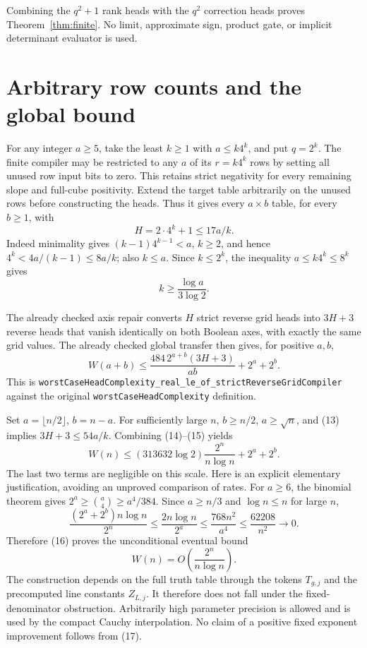 \documentclass[11pt]{article}
\begin{document}
Combining the $q^2+1$ rank heads with the $q^2$ correction heads
proves Theorem~\ref{thm:finite}. No limit, approximate sign, product
gate, or implicit determinant evaluator is used.

\section{Arbitrary row counts and the global bound}
For any integer $a\ge5$, take the least $k\ge1$ with
$a\le k4^k$, and put $q=2^k$. The finite compiler may be restricted
to any $a$ of its $r=k4^k$ rows by setting all unused row input bits
to zero. This retains strict negativity for every remaining slope
and full-cube positivity. Extend the target table arbitrarily on
the unused rows before constructing the heads. Thus it gives every
$a\times b$ table, for every $b\ge1$, with
\[
 H=2\cdot4^k+1\le17a/k.
 \tag{13}
\]
Indeed minimality gives $(k-1)4^{k-1}<a$, $k\ge2$, and hence
$4^k<4a/(k-1)\le8a/k$; also $k\le a$.
Since $k\le2^k$, the inequality $a\le k4^k\le8^k$ gives
\[
 k\ge\frac{\log a}{3\log2}.
 \tag{14}
\]

The already checked axis repair converts $H$ strict reverse grid
heads into $3H+3$ reverse heads that vanish identically on both
Boolean axes, with exactly the same grid values. The already checked
global transfer then gives, for positive $a,b$,
\[
 W(a+b)\le
 \frac{484\,2^{a+b}(3H+3)}{ab}+2^a+2^b.
 \tag{15}
\]
This is
\texttt{worstCaseHeadComplexity\_real\_le\_of\_strictReverseGridCompiler}
against the original \texttt{worstCaseHeadComplexity} definition.

Set $a=\lfloor n/2\rfloor$, $b=n-a$. For sufficiently large $n$,
$b\ge n/2$, $a\ge\sqrt n$, and (13) implies $3H+3\le54a/k$.
Combining (14)--(15) yields
\[
 W(n)\le
 (313632\log2)\frac{2^n}{n\log n}+2^a+2^b.
 \tag{16}
\]
The last two terms are negligible on this scale. Here is an explicit
elementary justification, avoiding an unproved comparison of rates.
For $a\ge6$, the binomial theorem gives
$2^a\ge\binom a4\ge a^4/384$. Since $a\ge n/3$ and
$\log n\le n$ for large $n$,
\[
 \frac{(2^a+2^b)n\log n}{2^n}
 \le\frac{2n\log n}{2^a}
 \le\frac{768n^2}{a^4}
 \le\frac{62208}{n^2}\longrightarrow0.
\]
Therefore (16) proves the unconditional eventual bound
\[
 \boxed{W(n)=O\!\left(\frac{2^n}{n\log n}\right).}
 \tag{17}
\]
The construction depends on the full truth table through the tokens
$T_{g,j}$ and the precomputed line constants $Z_{L,j}$. It therefore
does not fall under the fixed-denominator obstruction. Arbitrarily
high parameter precision is allowed and is used by the compact
Cauchy interpolation. No claim of a positive fixed exponent
improvement follows from (17).
\end{document}
